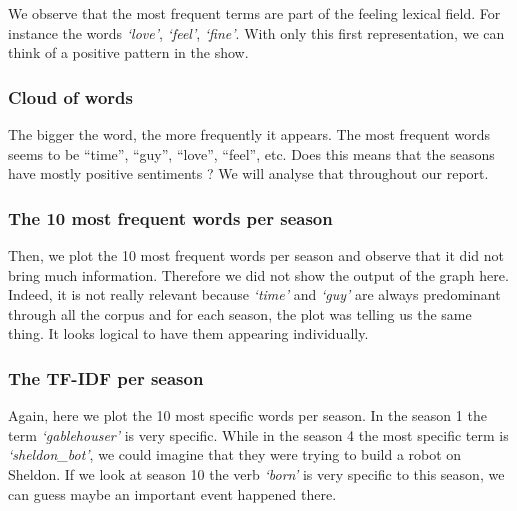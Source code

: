 \documentclass[
]{article}
\begin{document}
We observe that the most frequent terms are part of the feeling lexical
field. For instance the words \emph{`love'}, \emph{`feel'},
\emph{`fine'}. With only this first representation, we can think of a
positive pattern in the show.

\hypertarget{cloud-of-words}{%
\subsubsection{Cloud of words}\label{cloud-of-words}}

The bigger the word, the more frequently it appears. The most frequent
words seems to be ``time'', ``guy'', ``love'', ``feel'', etc. Does this
means that the seasons have mostly positive sentiments ? We will analyse
that throughout our report.

\hypertarget{the-10-most-frequent-words-per-season}{%
\subsubsection{The 10 most frequent words per
season}\label{the-10-most-frequent-words-per-season}}

Then, we plot the 10 most frequent words per season and observe that it
did not bring much information. Therefore we did not show the output of
the graph here. Indeed, it is not really relevant because \emph{`time'}
and \emph{`guy'} are always predominant through all the corpus and for
each season, the plot was telling us the same thing. It looks logical to
have them appearing individually.

\hypertarget{the-tf-idf-per-season}{%
\subsubsection{The TF-IDF per season}\label{the-tf-idf-per-season}}

Again, here we plot the 10 most specific words per season. In the season
1 the term \emph{`gablehouser'} is very specific. While in the season 4
the most specific term is \emph{`sheldon\_bot'}, we could imagine that
they were trying to build a robot on Sheldon. If we look at season 10
the verb \emph{`born'} is very specific to this season, we can guess
maybe an important event happened there.
\end{document}
